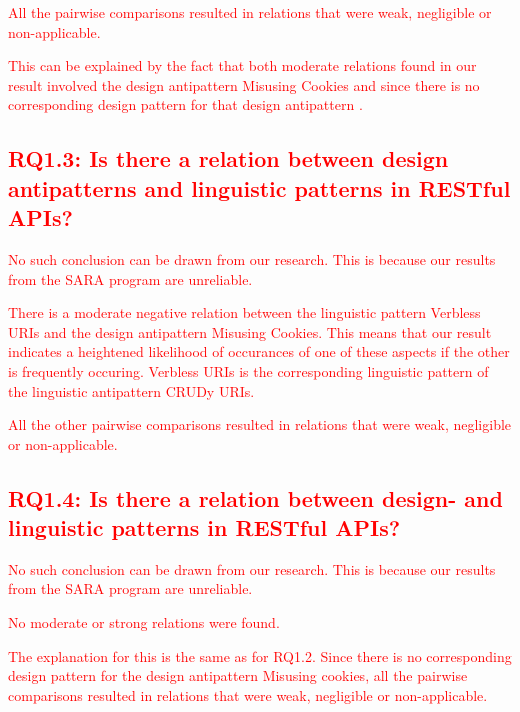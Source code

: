 \textcolor{red}{
All the pairwise comparisons resulted in relations that were weak, negligible or non-applicable. 
}

\textcolor{red}{
This can be explained by the fact that both moderate relations found in our result involved the design antipattern Misusing Cookies and since there is no corresponding design pattern for that design antipattern \cite{design}.
}

\subsection{\textcolor{red}{RQ1.3: Is there a relation between design antipatterns and linguistic patterns in RESTful APIs?}}

\textcolor{red}{No such conclusion can be drawn from our research. This is because our results from the SARA program are unreliable.}

\textcolor{red}{
There is a moderate negative relation between the linguistic pattern Verbless URIs and the design antipattern Misusing Cookies. This means that our result indicates a heightened likelihood of occurances of one of these aspects if the other is frequently occuring. Verbless URIs is the corresponding linguistic pattern of the linguistic antipattern CRUDy URIs. 
}

\textcolor{red}{
All the other pairwise comparisons resulted in relations that were weak, negligible or non-applicable. 
}

\subsection{\textcolor{red}{RQ1.4: Is there a relation between design- and linguistic patterns in RESTful APIs?}}

\textcolor{red}{No such conclusion can be drawn from our research. This is because our results from the SARA program are unreliable.}

\textcolor{red}{No moderate or strong relations were found.}

\textcolor{red}{
The explanation for this is the same as for RQ1.2. Since there is no corresponding design pattern for the design antipattern Misusing cookies, all the pairwise comparisons resulted in relations that were weak, negligible or non-applicable. 
}

\newpage